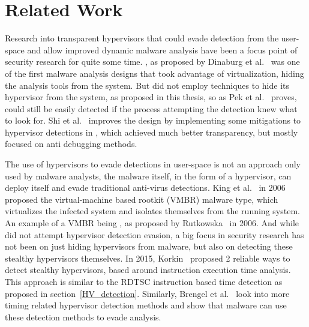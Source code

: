 \section{Related Work}\label{s:related}

Research into transparent hypervisors that could evade detection from the user-space and allow improved dynamic malware analysis have been a focus point 
of security research for quite some time. , as proposed by Dinaburg et al.~\cite{ether} was one of the first malware analysis designs that took 
advantage of virtualization, hiding the analysis tools from the system. But  did not employ techniques to hide its hypervisor from the system, as proposed in this thesis, 
so as Pek et al.~\cite{n-eteher} proves,  could still be easily detected if the process attempting the detection knew what to look for. Shi et al.~\cite{apate} improves 
the design by implementing some mitigations to hypervisor detections in , which achieved much better transparency, but mostly focused on anti debugging methods.

The use of hypervisors to evade detections in user-space is not an approach only used by malware analysts, the malware itself, in the form of a hypervisor, can deploy itself 
and evade traditional anti-virus detections. King et al.~\cite{1624022} in 2006 proposed the virtual-machine based rootkit (VMBR) malware type, which virtualizes the infected system 
and isolates themselves from the running system. An example of a VMBR being , as proposed by Rutkowska~\cite{rutkowska2006introducing} in 2006. 
And while  did not attempt hypervisor detection evasion, a big focus in security research has not been on just hiding hypervisors from malware, 
but also on detecting these stealthy hypervisors themselves. In 2015, Korkin~\cite{stealthy-hv-detection} proposed 2 reliable ways to detect stealthy hypervisors, 
based around instruction execution time analysis. This approach is similar to the RDTSC instruction based time detection as proposed in section~\ref{HV_detection}.
Similarly, Brengel et al.~\cite{brengel2016detecting} look into more timing related hypervisor detection methods and show that malware can use these detection methods to evade analysis.

